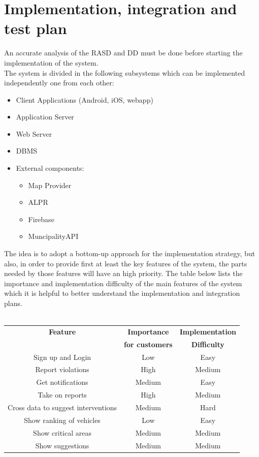 \documentclass{article}
\begin{document}
\clearpage
\section{Implementation, integration and test plan}
\label{sec:ittp}
An accurate analysis of the RASD and DD must be done before starting the implementation of the system.\\
The system is divided in the following subsystems which can be implemented independently one from each other:
\begin{itemize}
	\item Client Applications (Android, iOS, webapp)
	\item Application Server
	\item Web Server
	\item DBMS
	\item External components:
	\begin{itemize}
		\item Map Provider
		\item ALPR
		\item Firebase
		\item MuncipalityAPI
	\end{itemize}
\end{itemize}
The idea is to adopt a bottom-up approach for the implementation strategy, but also, in order to provide first at least the key features of the system, the parts needed by those features will have an high priority.
The table below lists the importance and implementation difficulty of the main features of the system which it is helpful to better understand the implementation and integration plans.
\\ \\
\begin{tabular}{c|c|c}
\hline
\bf Feature & \bf Importance & \bf Implementation \\& \bf for customers & \bf Difficulty\\
\hline
\hline
Sign up and Login & Low & Easy\\
\hline
Report violations & High & Medium \\
\hline
Get notifications & Medium & Easy\\
\hline
Take on reports & High & Medium \\
\hline
Cross data to suggest interventions  & Medium & Hard\\
\hline
Show ranking of vehicles & Low & Easy\\
\hline
Show critical areas & Medium & Medium\\
\hline
Show suggestions & Medium & Medium\\
\hline
\end{tabular}
\end{document}
